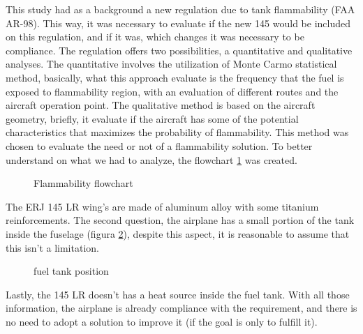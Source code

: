 This study had as a background a new regulation due to tank flammability (FAA AR-98). This way, it was necessary to evaluate if the new 145 would be included on this regulation, and if it was, which changes it was necessary to be compliance.
The regulation offers two possibilities, a quantitative and qualitative analyses. The quantitative involves the utilization of Monte Carmo statistical method, basically, what this approach evaluate is the frequency that the fuel is exposed to flammability region, with an evaluation of different routes and the aircraft operation point.
The qualitative method is based on the aircraft geometry, briefly, it evaluate if the aircraft has some of the potential characteristics that maximizes the probability of flammability.  This method was chosen to evaluate the need or not of a flammability solution. To better understand on what we had to analyze, the flowchart \ref{fig:Flammabilityflowchart} was created.

\begin{figure}[H] %
\caption{Flammability flowchart}
\label{fig:Flammabilityflowchart}
\end{figure}

The ERJ 145 LR wing's are made of aluminum alloy with some titanium reinforcements. The second question, the airplane has a small portion of the tank inside the fuselage (figura \ref{fig:fueltankposition}), despite this aspect, it is reasonable to assume that this isn't a limitation.

\begin{figure}[H] %
\caption{fuel tank position}
\label{fig:fueltankposition}
\end{figure}

Lastly, the 145 LR doesn't has a heat source inside the fuel tank. With all those information, the airplane is already compliance with the requirement, and there is no need to adopt a solution to improve it (if the goal is only to fulfill it).
